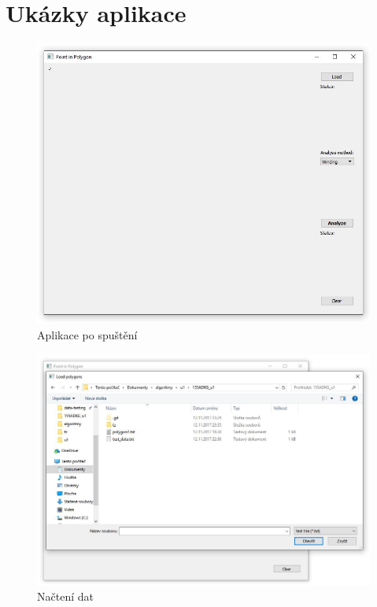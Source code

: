 \documentclass{article}
\begin{document}
\section{Ukázky aplikace} %
\begin{figure}[htbp]
\centering
        \includegraphics[clip, trim=0cm 0cm 0cm 0cm, width=1\textwidth]{empty_app.jpg}
        \caption{Aplikace po spuštění}
\end{figure}
\begin{figure}[htbp]
\centering
        \includegraphics[clip, trim=0cm 0cm 0cm 0cm, width=1\textwidth]{load.jpg}
        \caption{Načtení dat}
\end{figure}
\end{document}
